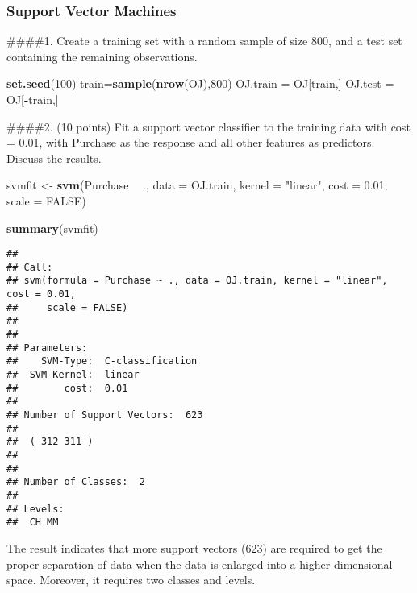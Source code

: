 \documentclass[]{article}
\newenvironment{Shaded}{\begin{snugshade}}{\end{snugshade}}
\newcommand{\DataTypeTok}[1]{\textcolor[rgb]{0.13,0.29,0.53}{#1}}
\newcommand{\DecValTok}[1]{\textcolor[rgb]{0.00,0.00,0.81}{#1}}
\newcommand{\FloatTok}[1]{\textcolor[rgb]{0.00,0.00,0.81}{#1}}
\newcommand{\KeywordTok}[1]{\textcolor[rgb]{0.13,0.29,0.53}{\textbf{#1}}}
\newcommand{\NormalTok}[1]{#1}
\newcommand{\OperatorTok}[1]{\textcolor[rgb]{0.81,0.36,0.00}{\textbf{#1}}}
\newcommand{\OtherTok}[1]{\textcolor[rgb]{0.56,0.35,0.01}{#1}}
\newcommand{\StringTok}[1]{\textcolor[rgb]{0.31,0.60,0.02}{#1}}
\begin{document}
\hypertarget{support-vector-machines}{%
\subsubsection{Support Vector Machines}\label{support-vector-machines}}

\#\#\#\#1. Create a training set with a random sample of size 800, and a
test set containing the remaining observations.

\begin{Shaded}
\begin{Highlighting}[]
\KeywordTok{set.seed}\NormalTok{(}\DecValTok{100}\NormalTok{)}
\NormalTok{train=}\KeywordTok{sample}\NormalTok{(}\KeywordTok{nrow}\NormalTok{(OJ),}\DecValTok{800}\NormalTok{)}
\NormalTok{OJ.train =}\StringTok{ }\NormalTok{OJ[train,]}
\NormalTok{OJ.test =}\StringTok{ }\NormalTok{OJ[}\OperatorTok{-}\NormalTok{train,]}
\end{Highlighting}
\end{Shaded}

\#\#\#\#2. (10 points) Fit a support vector classifier to the training
data with cost = 0.01, with Purchase as the response and all other
features as predictors. Discuss the results.

\begin{Shaded}
\begin{Highlighting}[]
\NormalTok{svmfit <-}\StringTok{ }\KeywordTok{svm}\NormalTok{(Purchase }\OperatorTok{~}\StringTok{ }\NormalTok{., }
             \DataTypeTok{data =}\NormalTok{ OJ.train, }
             \DataTypeTok{kernel =} \StringTok{"linear"}\NormalTok{, }
             \DataTypeTok{cost =} \FloatTok{0.01}\NormalTok{, }
             \DataTypeTok{scale =} \OtherTok{FALSE}\NormalTok{)}

\KeywordTok{summary}\NormalTok{(svmfit)}
\end{Highlighting}
\end{Shaded}

\begin{verbatim}
## 
## Call:
## svm(formula = Purchase ~ ., data = OJ.train, kernel = "linear", cost = 0.01, 
##     scale = FALSE)
## 
## 
## Parameters:
##    SVM-Type:  C-classification 
##  SVM-Kernel:  linear 
##        cost:  0.01 
## 
## Number of Support Vectors:  623
## 
##  ( 312 311 )
## 
## 
## Number of Classes:  2 
## 
## Levels: 
##  CH MM
\end{verbatim}

The result indicates that more support vectors (623) are required to get
the proper separation of data when the data is enlarged into a higher
dimensional space. Moreover, it requires two classes and levels.
\end{document}
